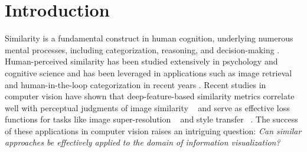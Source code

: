 \documentclass[sigconf]{acmart}
\begin{document}


\maketitle
\section{Introduction} 

Similarity is a fundamental construct in human cognition, underlying numerous mental processes, including categorization, reasoning, and decision-making \cite{medinRespectsSimilarity1993}. Human-perceived similarity has been studied extensively in psychology and cognitive science \cite{kriegeskorte2008representational, roads2024modeling} and has been leveraged in applications such as image retrieval \cite{guo2002learning} and human-in-the-loop categorization \cite{wah2015learning, roads2017improving} in recent years \cite{roads2021enriching}. 
Recent studies in computer vision have shown that deep-feature-based similarity metrics correlate well with perceptual judgments of image similarity ~\cite{zhangUnreasonableEffectivenessDeep2018} and serve as effective loss functions for tasks like image super-resolution ~\cite{johnson2016perceptual} and style transfer ~\cite{gatysNeuralAlgorithmArtistic2015}.
The success of these applications in computer vision raises an intriguing question: \textit{Can similar approaches be effectively applied to the domain of information visualization?} 
\end{document}
